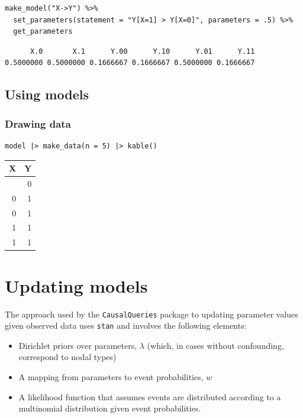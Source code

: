 \documentclass[
  article]{jss}
\providecommand{\tightlist}{%
  \setlength{\itemsep}{0pt}\setlength{\parskip}{0pt}}\usepackage{longtable,booktabs,array}
\begin{document}
\begin{verbatim}
make_model("X->Y") %>%
  set_parameters(statement = "Y[X=1] > Y[X=0]", parameters = .5) %>%
  get_parameters
\end{verbatim}

\begin{verbatim}
      X.0       X.1      Y.00      Y.10      Y.01      Y.11 
0.5000000 0.5000000 0.1666667 0.1666667 0.5000000 0.1666667 
\end{verbatim}

\hypertarget{using-models}{%
\subsection{Using models}\label{using-models}}

\hypertarget{drawing-data}{%
\subsubsection{Drawing data}\label{drawing-data}}

\begin{verbatim}
model |> make_data(n = 5) |> kable()
\end{verbatim}

\begin{longtable}[]{@{}rr@{}}
\toprule\noalign{}
X & Y \\
\midrule\noalign{}
\endhead
\bottomrule\noalign{}
\endlastfoot
0 & 0 \\
0 & 1 \\
0 & 1 \\
1 & 1 \\
1 & 1 \\
\end{longtable}

\hypertarget{updating-models}{%
\section{Updating models}\label{updating-models}}

The approach used by the \texttt{CausalQueries} package to updating
parameter values given observed data uses \texttt{stan} and involves the
following elements:

\begin{itemize}
\tightlist
\item
  Dirichlet priors over parameters, \(\lambda\) (which, in cases without
  confounding, correspond to nodal types)
\item
  A mapping from parameters to event probabilities, \(w\)
\item
  A likelihood function that assumes events are distributed according to
  a multinomial distribution given event probabilities.
\end{itemize}
\end{document}
